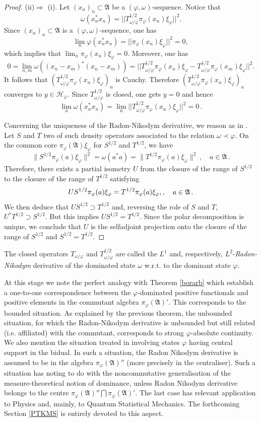 \documentclass[12pt]{amsart}
\numberwithin{equation}{section}
\def\ga{{\mathfrak A}} \def\gpa{{\mathfrak a}}
\def\f{\varphi}\def\ff{\phi} \def\F{\Phi}
\def\om{\omega} \def\Om{\Omega}
\begin{document}
\begin{proof}
(ii)$\Rightarrow$ (i). Let $(x_n)_n\subset\ga$ be a $(\f,\om)$-sequence. Notice that
$$\om(x_n^*x_n)=||T_{\om/\f}^{1/2}\pi_\f(x_n)\xi_\f||^2. $$
Since $(x_n)_n\subset\ga$ is a $(\f,\om)$-sequence, one has
$$\lim_n\varphi(x_n^*x_n)=||\pi_\f(x_n)\xi_\f||^2=0,$$
which implies that $\lim_n\pi_\f(x_n)\xi_\f=0$. Moreover, one has
$$0=\lim_{n,m}\om((x_n-x_m)^*(x_n-x_m))=||T_{\om/\f}^{1/2}\pi_\f(x_n)\xi_\f-T_{\om/\f}^{1/2}\pi_\f(x_m)\xi_\f||^2.$$
It follows that $\left( T_{\om/\f}^{1/2}\pi_\f(x_n)\xi_\f\right)_n$ is Cauchy. Therefore $\left( T_{\om/\f}^{1/2}\pi_\f(x_n)\xi_\f\right)_n$ converges to $y\in\mathcal H_\varphi$. Since $T_{\om/\f}^{1/2}$ is closed, one gets $y=0$ and hence
$$
\lim_n\om(x_n^*x_n)=\lim_n||T_{\om/\f}^{1/2}\pi_\f(x_n)\xi_\f||^2=0\,.
$$

Concerning the uniqueness of the Radon-Nikodym derivative, we reason as in \cite{N}. Let $S$ and $T$ two of such density operators associated to the relation $\om\prec\f$. On the common core $\pi_\f(\ga)\xi_\f$ for $S^{1/2}$ and $T^{1/2}$, we have
 $$
 \|S^{1/2}\pi_\f(a)\xi_\f\|^2=\om(a^*a)= \|T^{1/2}\pi_\f(a)\xi_\f\|^2\,,\quad a\in\ga\,.
 $$
Therefore, there exists a partial isometry $U$ from the closure of the range of $S^{1/2}$ to the closure of the range of $T^{1/2}$
satisfying
$$
 US^{1/2}\pi_\f(a)\xi_\f=T^{1/2}\pi_\f(a)\xi_\f\\,,\quad a\in\ga\,.
$$
We then deduce that $US^{1/2}\supset T^{1/2}$ and, reversing the role of $S$ and $T$, $U^*T^{1/2}\supset S^{1/2}$. But this implies $US^{1/2}=T^{1/2}$. Since the polar decomposition is unique, we conclude that $U$ is the selfadjoint projection onto the closure of the range of $S^{1/2}$ and $S^{1/2}=T^{1/2}$.
\end{proof}
The closed operators $T_{\om/\f}$ and $T^{1/2}_{\om/\f}$ are called the $L^1$ and, respectively, $L^2$-{\it Radon-Nikodym} derivative of the dominated state $\om$ w.r.t. to the dominant state $\f$.

At this stage we note the perfect analogy with Theorem \ref{borarb} which establish a one-to-one correspondence between the $\f$-dominated positive functionals and positive elements in the commutant algebra $\pi_\f(\ga)'$. This corresponds to the bounded situation. As explained by the previous theorem, the unbounded situation, for which the Radon-Nikodym derivative is unbounded but still related (i.e. affiliated) with the commutant, corresponds to strong $\f$-absolute continuity. We also mention the situation treated in \cite{PT} involving states $\f$ having central support in the bidual. In such a situation, the Radon Nikodym derivative is assumed to be in the algebra $\pi_\f(\ga)''$ (more precisely in the centraliser). Such a situation has noting to do with the noncommutative generalisation of the measure-theoretical notion of dominance, unless Radon Nikodym derivative belongs to the centre
$\pi_\f(\ga)''\bigcap\pi_\f(\ga)'$. The last case has relevant application to Physics and, mainly, to Quantum Statistical Mechanics. The forthcoming Section \ref{PTKMS} is entirely devoted to this aspect.
\end{document}
